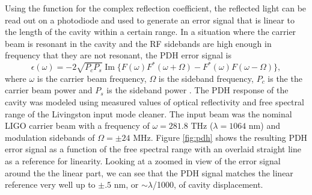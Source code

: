 Using the function for the complex reflection coefficient, the reflected light 
can be read out on a photodiode and used to generate an 
error signal that is linear to the length of the cavity within a certain range. 
In a situation where the carrier beam is resonant in the cavity and the RF 
sidebands are high enough in frequency that they are not resonant, the PDH error 
signal is
\begin{equation}
\epsilon(\omega) = -2\sqrt{P_{c}P_{s}}\operatorname{Im}\{F(\omega)F^*(\omega + \Omega) - F^*(\omega)F(\omega - \Omega)\},
\end{equation}
where $\omega$ is the carrier beam frequency, $\Omega$ is the sideband 
frequency, $P_{c}$ is the the carrier beam power and $P_{s}$ is the 
sideband power \cite{Black01}.
The PDH response of the cavity was modeled using measured values of optical 
reflectivity and free spectral range of the Livingston input mode cleaner. 
The input beam was the nominal LIGO carrier beam with a frequency of 
$\omega = 281.8$ THz ($\lambda = 1064$ nm) and modulation sidebands of 
$\Omega = \pm24$ MHz.
Figure \ref{fig:pdh} shows the resulting PDH error signal as a function of 
the free spectral range with an overlaid straight line as a reference for 
linearity. Looking at a zoomed in view of the error signal around the the linear 
part, we can see that the PDH signal matches the linear reference very well 
up to $\pm.5$ nm, or $\sim\lambda$/1000, of cavity displacement. 

